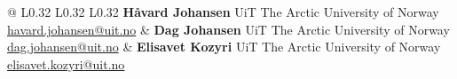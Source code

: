 


\noindent
\setlength{\tabcolsep}{0pt} %
\begin{tabular*}{\textwidth}{@{\extracolsep{\fill}} L{0.32\textwidth} L{0.32\textwidth} L{0.32\textwidth}}
\textbf{Håvard Johansen} \newline
UiT The Arctic University of Norway \newline
\href{mailto:havard.johansen@uit.no}{havard.johansen@uit.no}
&
\textbf{Dag Johansen} \newline
UiT The Arctic University of Norway \newline
\href{mailto:dag.johansen@uit.no}{dag.johansen@uit.no}
&
\textbf{Elisavet Kozyri} \newline
UiT The Arctic University of Norway \newline
\href{mailto:elisavet.kozyri@uit.no}{elisavet.kozyri@uit.no}
\end{tabular*}